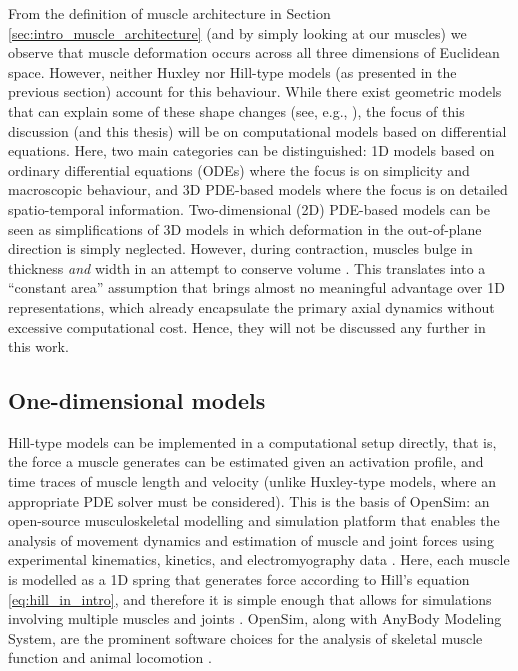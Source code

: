 \documentclass{sfuthesis}
\numberwithin{equation}{section}
\numberwithin{figure}{chapter}
\numberwithin{table}{chapter}
\theoremstyle{definition}
\begin{document}
From the definition of muscle architecture in Section \ref{sec:intro_muscle_architecture} (and by simply looking at our muscles) we observe that muscle deformation occurs across all three dimensions of Euclidean space. However, neither Huxley nor Hill-type models (as presented in the previous section) account for this behaviour. While there exist geometric models that can explain some of these shape changes (see, e.g., \cite{DickWakeling2018,Siebert20123D}), the focus of this discussion (and this thesis) will be on computational models based on differential equations. Here, two main categories can be distinguished: 1D models based on ordinary differential equations (ODEs) where the focus is on simplicity and macroscopic behaviour, and 3D PDE-based models where the focus is on detailed spatio-temporal information. Two-dimensional (2D) PDE-based models can be seen as simplifications of 3D models in which deformation in the out-of-plane direction is simply neglected. However, during contraction, muscles bulge in thickness \textit{and} width in an attempt to conserve volume \cite{BaskinPaolini}. This translates into a ``constant area'' assumption \cite{EpsteinHerzog2003} that brings almost no meaningful advantage over 1D representations, which already encapsulate the primary axial dynamics without excessive computational cost. Hence, they will not be discussed any further in this work.

\subsection{One-dimensional models}

Hill-type models can be implemented in a computational setup directly, that is, the force a muscle generates can be estimated given an activation profile, and time traces of muscle length and velocity (unlike Huxley-type models, where an appropriate PDE solver must be considered). This is the basis of OpenSim:
an open-source musculoskeletal modelling and simulation platform that enables the analysis of movement dynamics and estimation of muscle and joint forces using experimental kinematics, kinetics, and electromyography data \cite{Delp2007OpenSim}. Here, each muscle is modelled as a 1D spring that generates force according to Hill's equation \eqref{eq:hill_in_intro}, and therefore it is simple enough that allows for simulations involving multiple muscles and joints \cite{BishopEtAl2021Dinosaurs, Porsa2016DirectMethodsOpenSim, RajagopalEtAl2016FullBody, StarkEtAl2021Dogs}. OpenSim, along with AnyBody Modeling System\texttrademark, are the prominent software choices for the analysis of skeletal muscle function and animal locomotion \cite{Gautam2024AnybodyOpensim}.
\end{document}
